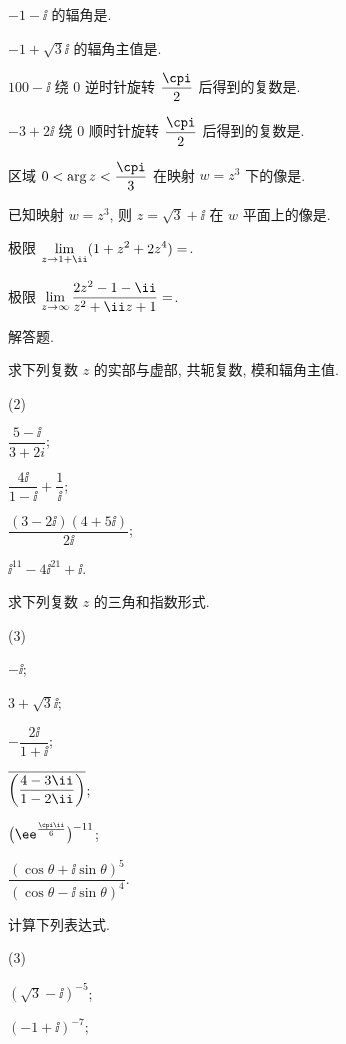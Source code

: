 \begin{homework}
\begin{homework}
    \item $-1-\ii$ 的辐角是\fillblank{}.
    \item $-1+\sqrt 3\ii$ 的辐角主值是\fillblank{}.
    \item $100-\ii$ 绕 $0$ 逆时针旋转 $\dfrac\cpi2$ 后得到的复数是\fillblank{}.
    \item $-3+2\ii$ 绕 $0$ 顺时针旋转 $\dfrac\cpi2$ 后得到的复数是\fillblank{}.
    \item 区域 $0<\arg z<\dfrac\cpi3$ 在映射 $w=z^3$ 下的像是\fillblank[12em]{}.
    \item 已知映射 $w=z^3$, 则 $z=\sqrt3+\ii$ 在 $w$ 平面上的像是\fillblank{}.
    \item 极限 $\displaystyle\lim_{z\ra 1+\ii}(1+z^2+2z^4)=$\fillblank{}.
    \item 极限 $\displaystyle\lim_{z\ra\infty}\dfrac{2z^2-1-\ii}{z^2+\ii z+1}=$\fillblank{}.
  \end{homework}
  \item 解答题.
  \begin{homework}
    \item 求下列复数 $z$ 的实部与虚部, 共轭复数, 模和辐角主值.
    \begin{subhomework}(2)
      \item $\dfrac{5-\ii}{3+2i}$;
      \item $\dfrac{4\ii}{1-\ii}+\dfrac1\ii$;
      \item $\dfrac{(3-2\ii)(4+5\ii)}{2\ii}$;
      \item $\ii^{11}-4\ii^{21}+\ii$.
    \end{subhomework}
    \item 求下列复数 $z$ 的三角和指数形式.
    \begin{subhomework}(3)
      \item $-\ii$;
      \item $3+\sqrt 3\ii$;
      \item $-\dfrac{2\ii}{1+\ii}$;
      \item $\ov{\biggl(\dfrac{4-3\ii}{1-2\ii}\biggr)}$;
      \item $\bigl(\ee^{\frac{\cpi\ii}6}\bigr)^{-11}$;
      \item $\dfrac{(\cos \theta+\ii\sin \theta)^5}{(\cos \theta-\ii\sin \theta)^4}$.
    \end{subhomework}
    \item 计算下列表达式.
    \begin{subhomework}(3)
      \item $(\sqrt3-\ii)^{-5}$;
      \item $(-1+\ii)^{-7}$;

\end{subhomework}
\end{homework}
\end{homework}
